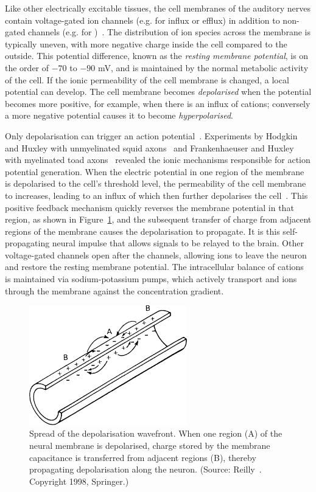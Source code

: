 Like other electrically excitable tissues, the cell membranes of the auditory
nerves contain voltage-gated ion channels (e.g. for  influx or 
efflux) in addition to non-gated channels (e.g. for )~\cite{brown2001}.
The distribution of ion species across the membrane is typically uneven, with
more negative charge inside the cell compared to the outside. This potential
difference, known as the \emph{resting membrane potential}, is on the order of $
-70 $ to $ -90 $ mV, and is maintained by the normal metabolic activity of the
cell. If the ionic permeability of the cell membrane is changed, a local
potential can develop. The cell membrane becomes \emph{depolarised} when the
potential becomes more positive, for example, when there is an influx of
cations; conversely a more negative potential causes it to become
\emph{hyperpolarised}.

Only depolarisation can trigger an action potential~\cite{reilly1998}.
Experiments by Hodgkin and Huxley with unmyelinated squid
axons~\cite{hodgkin1952} and Frankenhaeuser and Huxley with myelinated toad
axons~\cite{frankenhaeuser1964} revealed the ionic mechanisms responsible for
action potential generation. When the electric potential in one region of the
membrane is depolarised to the cell's threshold level, the permeability of the
cell membrane to  increases, leading to an influx of  which
then further depolarises the cell~\cite{brown2001}. This positive feedback
mechanism quickly reverses the membrane potential in that region, as shown in
Figure~\ref{fig:depolarisation_wavefront}, and the subsequent transfer of charge
from adjacent regions of the membrane causes the depolarisation to propagate. It
is this self-propagating neural impulse that allows signals to be relayed to the
brain. Other voltage-gated channels open after the  channels, allowing
 ions to leave the neuron and restore the resting membrane potential.
The intracellular balance of cations is maintained via sodium-potassium pumps,
which actively transport  and  ions through the membrane
against the concentration gradient.

\begin{figure}
	\centering
	\includegraphics[height=5.2cm]{Background/depolarisation_wavefront}
	\caption[Spread of the depolarisation wavefront]{Spread of the depolarisation
	wavefront. When one region (A) of the neural membrane is depolarised, charge
	stored by the membrane capacitance is transferred from adjacent regions (B),
	thereby propagating depolarisation along the neuron. (Source:
	Reilly~\cite{reilly1998}. Copyright \textcopyright{} 1998, Springer.)}
	\label{fig:depolarisation_wavefront}
\end{figure}

